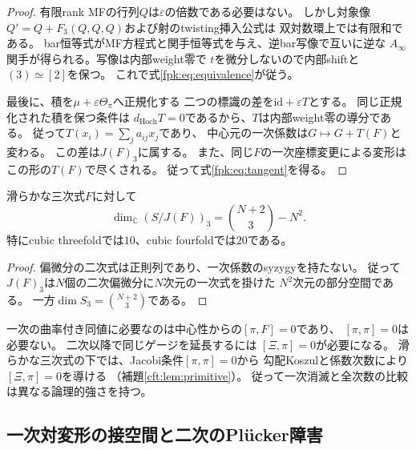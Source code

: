 \begin{proof}
有限rank MFの行列$Q$は$\varepsilon$の倍数である必要はない。
しかし対象像$Q'=Q+F_3(Q,Q,Q)$および射のtwisting挿入公式は
双対数環上では有限和である。
bar恒等式がMF方程式と関手恒等式を与え、逆bar写像で互いに逆な
$A_\infty$関手が得られる。写像は内部weight零で
$t$を微分しないので内部shiftと$(3)\simeq[2]$を保つ。
これで式\eqref{fpk:eq:equivalence}が従う。

最後に、積を$\mu+\varepsilon\Theta_\pi$へ正規化する
二つの標識の差を$\mathrm{id}+\varepsilon T$とする。
同じ正規化された積を保つ条件は
$d_{\mathrm{Hoch}}T=0$であるから、$T$は内部weight零の導分である。
従って$T(x_i)=\sum_j a_{ij}x_j$であり、
中心元の一次係数は$G\mapsto G+T(F)$と変わる。
この差は$J(F)_3$に属する。
また、同じ$F$の一次座標変更による変形は
この形の$T(F)$で尽くされる。
従って式\eqref{fpk:eq:tangent}を得る。
\end{proof}

\begin{corollary}[Jacobian接空間の次元]
\label{fpk:cor:dimension}
滑らかな三次式$F$に対して
\begin{equation}\label{fpk:eq:dimension}
 \dim_{\mathbb C}(S/J(F))_3
 =\binom{N+2}{3}-N^2.
\end{equation}
特にcubic threefoldでは$10$、cubic fourfoldでは$20$である。
\end{corollary}
\begin{proof}
偏微分の二次式は正則列であり、一次係数のsyzygyを持たない。
従って$J(F)_3$は$N$個の二次偏微分に$N$次元の一次式を掛けた
$N^2$次元の部分空間である。
一方$\dim S_3=\binom{N+2}{3}$である。
\end{proof}

\begin{remark}[Jacobi条件が必要になる位置]
\label{fpk:rem:jacobi}
一次の曲率付き同値に必要なのは中心性からの$[\pi,F]=0$であり、
$[\pi,\pi]=0$は必要ない。
二次以降で同じゲージを延長するには
$[\Xi,\pi]=0$が必要になる。
滑らかな三次式の下では、Jacobi条件$[\pi,\pi]=0$から
勾配Koszulと係数次数により$[\Xi,\pi]=0$を導ける
（補題\ref{cft:lem:primitive}）。
従って一次消滅と全次数の比較は異なる論理的強さを持つ。
\end{remark}


\subsection{一次対変形の接空間と二次のPl\"ucker障害}

